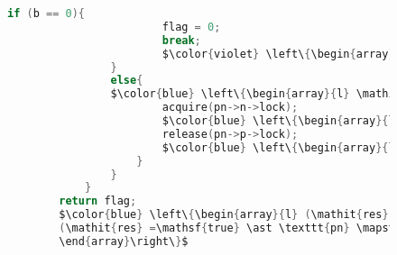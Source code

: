 \documentclass[a4paper,UKenglish,cleveref, autoref, thm-restate]{lipics-v2021}
\newcommand{\islock}{\boxdotright}
\newcommand{\lockvar}{\islock}
\begin{document}
\begin{figure}[h]
\begin{lstlisting}[language = C, style=myStyle, mathescape=true]
				if (b == 0){
						flag = 0;
						break;
						$\color{violet} \left\{\begin{array}{l} \mathit{res} = \mathsf{false} \ast \texttt{pn} \mapsto (\texttt{n, n}) \ast \texttt{n->t} \neq \texttt{NULL} \ast \texttt{n'} = \texttt{n} \ast \texttt{n->lock} \lockvar \mathsf{R}(\texttt{n}) \ast \mathsf{R}(\texttt{n}) \ast \texttt{k} \in \mathsf{range}(\texttt{n}) \ast \cdots    \end{array}\right\}$
				}
				else{
				$\color{blue} \left\{\begin{array}{l} \mathit{res} = \mathsf{true} \ast \texttt{pn} \mapsto (\texttt{n, n}) \ast  \texttt{n->lock} \lockvar \mathsf{R}(\texttt{n}) \ast \mathsf{R}(\texttt{n}) \ast \texttt{n->t} \mapsto \texttt{n'} \ast \texttt{n'->lock} \lockvar \mathsf{R}(\texttt{n'}) \ast \cdots    \end{array}\right\}$
						acquire(pn->n->lock);
						$\color{blue} \left\{\begin{array}{l} \mathit{res} = \mathsf{true} \ast \texttt{pn} \mapsto (\texttt{n, n}) \ast  \texttt{n->lock} \lockvar \mathsf{R}(\texttt{n}) \ast \mathsf{R}(\texttt{n}) \ast \\ \texttt{n->t} \mapsto \texttt{n'} \ast \texttt{n'->lock} \lockvar \mathsf{R}(\texttt{n'}) \ast \mathsf{R}(\texttt{n'}) \ast \cdots    \end{array}\right\}$
						release(pn->p->lock);
						$\color{blue} \left\{\begin{array}{l} \mathit{res} = \mathsf{true} \ast \texttt{pn} \mapsto (\texttt{n, n}) \ast  \texttt{n->lock} \lockvar \mathsf{R}(\texttt{n}) \ast \\ \texttt{n->t} \mapsto \texttt{n'} \ast \texttt{n'->lock} \lockvar \mathsf{R}(\texttt{n'}) \ast \mathsf{R}(\texttt{n'}) \ast \cdots    \end{array}\right\}$
					}
				}
			}
		return flag;
		$\color{blue} \left\{\begin{array}{l} (\mathit{res} = \mathsf{false} \ast \texttt{pn} \mapsto (\texttt{p', p'}) \ast \texttt{p'->t} \neq \texttt{NULL} \ast \texttt{p'->lock} \lockvar \mathsf{R}(\texttt{p'}) \ast \mathsf{R}(\texttt{p'}) \ast \texttt{k} \in \mathsf{range}(\texttt{p'}) \ast \cdots) \  \lor \\
		(\mathit{res} =\mathsf{true} \ast \texttt{pn} \mapsto (\texttt{p', p'}) \ast \texttt{p'->t} = \texttt{NULL}  \ast \texttt{p'->lock} \lockvar \mathsf{R}(\texttt{p'}) \ast \mathsf{R}(\texttt{p'}) \ast \texttt{k} \in \mathsf{range}(\texttt{p'}) \ast \cdots)
		\end{array}\right\}$

\end{lstlisting}
\end{figure}
\end{document}
